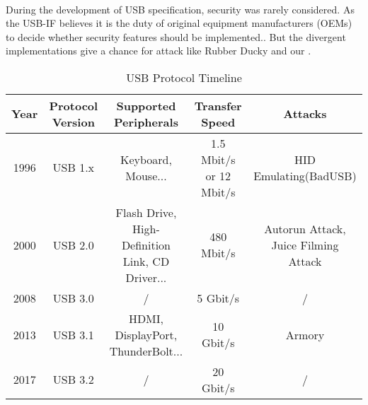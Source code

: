 \noindent{}\\
During the development of USB specification, security was rarely considered.  As the USB-IF believes it is the duty of original equipment manufacturers (OEMs) to decide whether security features should be implemented.. But the divergent implementations give a chance for attack like Rubber Ducky\cite{rubber} and our \tool.
\begin{table*}
\begin{tabular}{|c|c|c|c|c|}
	\hline
	Year & Protocol Version & Supported Peripherals & Transfer Speed & Attacks \\
	\hline
	1996 & USB 1.x & Keyboard, Mouse... & 1.5 Mbit/s or 12 Mbit/s & HID Emulating(BadUSB) \\
	\hline
	2000 & USB 2.0 & Flash Drive, High-Definition Link, CD Driver... & 480 Mbit/s & Autorun Attack, Juice Filming Attack \\
	\hline
	2008 & USB 3.0 & / & 5 Gbit/s & / \\
	\hline
	2013 & USB 3.1 & HDMI, DisplayPort, ThunderBolt... & 10 Gbit/s & Armory \\
	\hline
	2017 & USB 3.2 & / & 20 Gbit/s & / \\
	\hline
\end{tabular}
	\linebreak
\caption{USB Protocol Timeline}
\label{table:usb_timeline}
\end{table*}